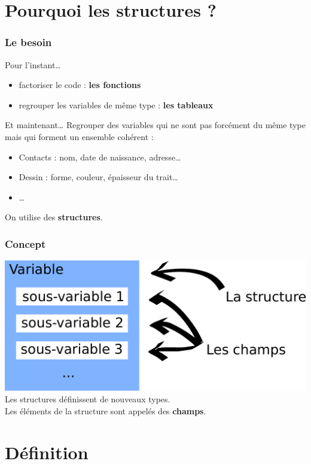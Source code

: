 \section{Pourquoi les structures ?}

\begin{frame}
	\frametitle{Le besoin}
	\begin{block}{Pour l'instant\dots}
		\begin{itemize}
			\item factoriser le code : \textbf{les fonctions}
			\item regrouper les variables de même type : \textbf{les tableaux}
		\end{itemize}
	\end{block}
	\begin{block}{Et maintenant\dots}
		Regrouper des variables qui ne sont pas forcément du même type mais qui forment un ensemble cohérent :
		\begin{itemize}
			\item Contacts : nom, date de naissance, adresse\dots
			\item Dessin : forme, couleur, épaisseur du trait\dots
			\item \dots
		\end{itemize}
	\end{block}
	On utilise des \textbf{structures}.
\end{frame}

\begin{frame}
	\frametitle{Concept}
	{
		\centering
		\includegraphics[width=\linewidth]{images/structure.pdf}
	}
	Les structures définissent de nouveaux types.\\
	Les éléments de la structure sont appelés des \textbf{champs}.
\end{frame}

\section{Définition}

